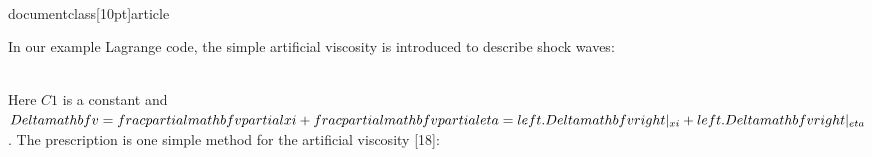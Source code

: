 \\documentclass[10pt]{article}
\begin{document}
{In our example Lagrange code, the simple artificial viscosity is introduced to describe shock waves:

\\[
q=C 1 \\rho \\begin{cases}0 & \\text { for } \\Delta \\mathbf{v} \\geq 0  \\tag{5.57}\\\\ (\\Delta \\mathbf{v})^{2} & \\text { for } \\Delta \\mathbf{v}<0\\end{cases}
\\]

Here $C 1$ is a constant and $\\Delta \\mathbf{v}=\\frac{\\partial \\mathbf{v}}{\\partial \\xi}+\\frac{\\partial \\mathbf{v}}{\\partial \\eta}=\\left.\\Delta \\mathbf{v}\\right|_{\\xi}+\\left.\\Delta \\mathbf{v}\\right|_{\\eta}$. The prescription is one simple method for the artificial viscosity [18]:


}
\end{document}
